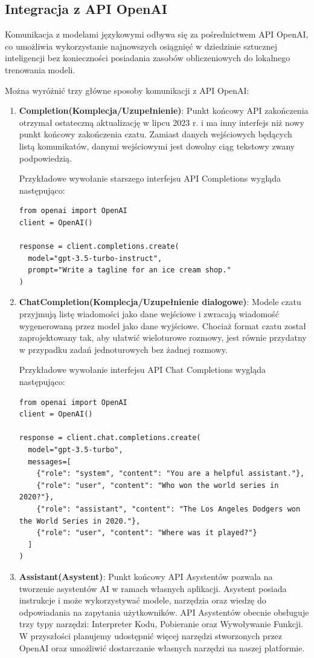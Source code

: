 \subsection{Integracja z API OpenAI}
Komunikacja z modelami językowymi odbywa się za pośrednictwem API OpenAI, co umożliwia wykorzystanie najnowszych osiągnięć w dziedzinie sztucznej inteligencji bez konieczności posiadania zasobów obliczeniowych do lokalnego trenowania modeli. 

Można wyróżnić trzy główne sposoby komunikacji z API OpenAI:
\begin{enumerate}
    \item \textbf{Completion(Komplecja/Uzupełnienie)}: Punkt końcowy API zakończenia otrzymał ostateczną aktualizację w lipcu 2023 r. i ma inny interfejs niż nowy punkt końcowy zakończenia czatu. Zamiast danych wejściowych będących listą komunikatów, danymi wejściowymi jest dowolny ciąg tekstowy zwany podpowiedzią.

    Przykładowe wywołanie starszego interfejsu API Completions wygląda następująco:
    \begin{listing}
        \begin{verbatim}
from openai import OpenAI
client = OpenAI()

response = client.completions.create(
  model="gpt-3.5-turbo-instruct",
  prompt="Write a tagline for an ice cream shop."
)
        \end{verbatim}
    \end{listing}
    \item \textbf{ChatCompletion(Komplecja/Uzupełnienie dialogowe)}: Modele czatu przyjmują listę wiadomości jako dane wejściowe i zwracają wiadomość wygenerowaną przez model jako dane wyjściowe. Chociaż format czatu został zaprojektowany tak, aby ułatwić wieloturowe rozmowy, jest równie przydatny w przypadku zadań jednoturowych bez żadnej rozmowy.

    Przykładowe wywołanie interfejsu API Chat Completions wygląda następująco:
    \begin{listing}
        \begin{verbatim}
from openai import OpenAI
client = OpenAI()

response = client.chat.completions.create(
  model="gpt-3.5-turbo",
  messages=[
    {"role": "system", "content": "You are a helpful assistant."},
    {"role": "user", "content": "Who won the world series in 2020?"},
    {"role": "assistant", "content": "The Los Angeles Dodgers won the World Series in 2020."},
    {"role": "user", "content": "Where was it played?"}
  ]
)
            \end{verbatim}
        \end{listing}
        \item \textbf{Assistant(Asystent)}: Punkt końcowy API Asystentów pozwala na tworzenie asystentów AI w ramach własnych aplikacji. Asystent posiada instrukcje i może wykorzystywać modele, narzędzia oraz wiedzę do odpowiadania na zapytania użytkowników. API Asystentów obecnie obsługuje trzy typy narzędzi: Interpreter Kodu, Pobieranie oraz Wywoływanie Funkcji. W przyszłości planujemy udostępnić więcej narzędzi stworzonych przez OpenAI oraz umożliwić dostarczanie własnych narzędzi na naszej platformie.
        

\end{enumerate}
